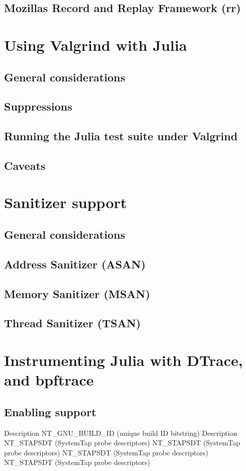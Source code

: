     \subsection{Mozilla{\textquotesingle}s Record and Replay Framework (rr)}
    \section{Using Valgrind with Julia}
    \subsection{General considerations}
    \subsection{Suppressions}
    \subsection{Running the Julia test suite under Valgrind}
    \subsection{Caveats}
    \section{Sanitizer support}
    \subsection{General considerations}
    \subsection{Address Sanitizer (ASAN)}
    \subsection{Memory Sanitizer (MSAN)}
    \subsection{Thread Sanitizer (TSAN)}
    \section{Instrumenting Julia with DTrace, and bpftrace}
    \subsection{Enabling support}
    Description
    NT_GNU_BUILD_ID (unique build ID bitstring)
    Description
    NT_STAPSDT (SystemTap probe descriptors)
    NT_STAPSDT (SystemTap probe descriptors)
    NT_STAPSDT (SystemTap probe descriptors)
    NT_STAPSDT (SystemTap probe descriptors)
